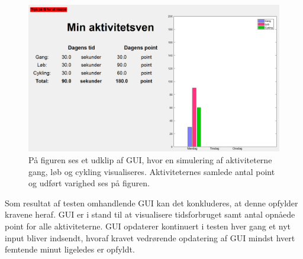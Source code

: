 \begin{figure}[H]
	\centering
	\includegraphics[scale=0.4]{figures/cDesign/test_GUI.png}
	\caption{På figuren ses et udklip af GUI, hvor en simulering af aktiviteterne gang, løb og cykling visualiseres. Aktiviteternes samlede antal point og udført varighed ses på figuren.}
	\label{fig:GUI2}
\end{figure}\vspace{-.25cm}
Som resultat af testen omhandlende GUI kan det konkluderes, at denne opfylder kravene heraf. GUI er i stand til at visualisere tidsforbruget samt antal opnåede point for alle aktiviteterne. GUI opdaterer kontinuert i testen hver gang et nyt input bliver indsendt, hvoraf kravet vedrørende opdatering af GUI mindst hvert femtende minut ligeledes er opfyldt.